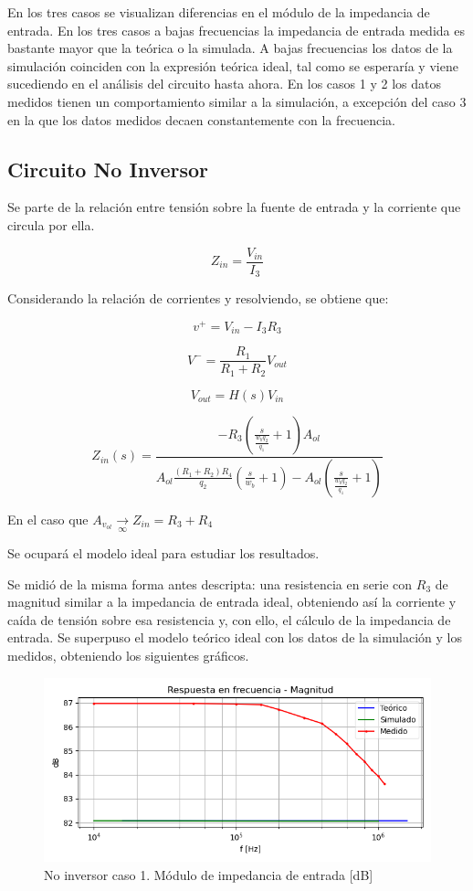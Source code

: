 En los tres casos se visualizan diferencias en el módulo de la impedancia de entrada. En los tres casos a bajas frecuencias la impedancia de entrada medida es bastante mayor que la teórica o la simulada. A bajas frecuencias los datos de la simulación coinciden con la expresión teórica ideal, tal como se esperaría y viene sucediendo en el análisis del circuito hasta ahora. En los casos 1 y 2 los datos medidos tienen un comportamiento similar a la simulación, a excepción del caso 3 en la que los datos medidos decaen constantemente con la frecuencia. 

\subsection{Circuito No Inversor}

Se parte de la relación entre tensión sobre la fuente de entrada y la corriente que circula por ella. 

$$Z_{in}=\frac{V_{in}}{I_{3}}$$

Considerando la relación de corrientes y resolviendo, se obtiene que:

$$v^{+}=V_{in}-I_{3}R_{3}$$

$$V^{-}=\frac{R_{1}}{R_{1}+R_{2}}V_{out}$$

$$V_{out}=H(s)V_{in}$$

$$Z_{in}(s)=\frac{-R_{3}(\frac{s}{\frac{w_{b}q_{2}}{q_{1}}}+1)A_{ol}}{A_{ol}\frac{(R_{1}+R_{2})R_{4}}{q_{2}}(\frac{s}{w_{b}}+1)-A_{ol}(\frac{s}{\frac{w_{b}q_{2}}{q_{1}}}+1)}$$

En el caso que $A_{v_{ol}}\underset{\infty }{\rightarrow} Z_{in}= R_{3}+R_{4}$

Se ocupará el modelo ideal para estudiar los resultados. 

Se midió de la misma forma antes descripta: una resistencia en serie con $R_{3}$ de magnitud similar a la impedancia de entrada ideal, obteniendo así la corriente y caída de tensión sobre esa resistencia y, con ello, el cálculo de la impedancia de entrada. Se superpuso el modelo teórico ideal con los datos de la simulación y los medidos, obteniendo los siguientes gráficos.

\begin{figure}[H]
	\centering
		\includegraphics[width=.8\linewidth]{./Imagenes/NoInvCaso1ZinGain.png}  
		\caption{No inversor caso 1. Módulo de impedancia de entrada [dB]}
	\label{fig:circinvcaso1}
\end{figure}

